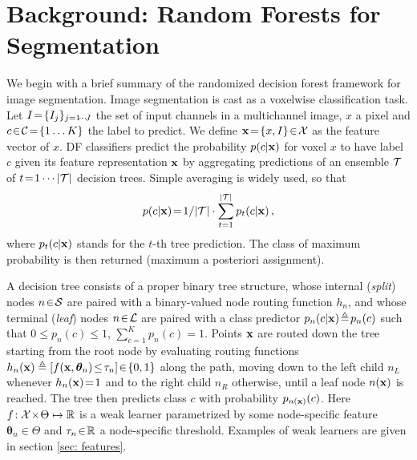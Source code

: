 
\section{Background: Random Forests for Segmentation}
\label{sec: background}

We begin with a brief summary of the randomized decision forest framework for image segmentation. Image segmentation is cast as a voxelwise classification task. Let $I\!=\!\{I_j\}_{j=1\!\cdots\! J}$ the set of input channels in a multichannel image, $x$ a pixel and $c\!\in\!\mathcal{C}\!=\!\{1 \dots K\}$ the label to predict. We define $\boldsymbol{\mathrm{x}}\!=\!\{x,I\}\!\in\!\mathcal{X}$ as the feature vector of $x$. DF classifiers predict the probability $p(c\vert\boldsymbol{\mathrm{x}})$ for voxel $x$ to have label $c$ given its feature representation $\boldsymbol{\mathrm{x}}$ by aggregating predictions of an ensemble $\mathcal{T}$ of $t\!=\!1\cdots \vert\mathcal{T}\vert$ decision trees. Simple averaging is widely used, so that 
$$p(c\vert\boldsymbol{\mathrm{x}})\!=\!1/\vert\mathcal{T}\vert\cdot\sum_{t=1}^{\vert\mathcal{T}\vert}p_t(c\vert\boldsymbol{\mathrm{x}})\, ,$$
where $p_t(c\vert\boldsymbol{\mathrm{x}})$ stands for the $t$-th tree prediction. The class of maximum probability is then returned (maximum a posteriori assignment). 

A decision tree consists of a proper binary tree structure, whose internal (\textit{split}) nodes $n\!\in\!\mathcal{S}$ are paired with a binary-valued node routing function $h_n$, and whose terminal (\textit{leaf}) nodes $n\!\in\!\mathcal{L}$ are paired with a class predictor $p_n(c\vert \boldsymbol{\mathrm{x}})\!\triangleq\!p_n(c)$ such that $0\!\leq\!p_n(c)\!\leq\!1$, $\sum_{c=1}^Kp_n(c)\!=\!1$. Points $\boldsymbol{\mathrm{x}}$ are routed down the tree starting from the root node by evaluating routing functions $h_n(\boldsymbol{\mathrm{x}})\triangleq[f(\boldsymbol{\mathrm{x}},\bm{\theta}_n)\!\leq\!\tau_n]\!\in\!\{0,1\}$ along the path, moving down to the left child $n_L$ whenever $h_n(\boldsymbol{\mathrm{x}})\!=\!1$ and to the right child $n_R$ otherwise, until a leaf node $n(\boldsymbol{\mathrm{x}})$ is reached. The tree then predicts class $c$ with probability $p_{n(\boldsymbol{\mathrm{x}})}(c)$. Here $f\!:\mathcal{X}\!\times\!\Theta\mapsto\mathbb{R}$ is a weak learner parametrized by some node-specific feature $\bm{\theta}_n\!\in\!\Theta$ and $\tau_n\!\in\!\mathbb{R}$ a node-specific threshold. Examples of weak learners are given in section \ref{sec: features}.


